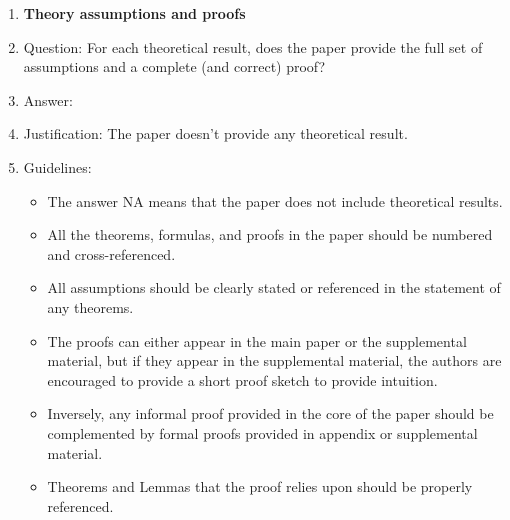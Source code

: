 \documentclass{article}
\begin{document}
\begin{enumerate}
\item {\bf Theory assumptions and proofs}
    \item[] Question: For each theoretical result, does the paper provide the full set of assumptions and a complete (and correct) proof?
    \item[] Answer: \answerNA{} %
    \item[] Justification: The paper doesn't provide any theoretical result.
    \item[] Guidelines:
    \begin{itemize}
        \item The answer NA means that the paper does not include theoretical results. 
        \item All the theorems, formulas, and proofs in the paper should be numbered and cross-referenced.
        \item All assumptions should be clearly stated or referenced in the statement of any theorems.
        \item The proofs can either appear in the main paper or the supplemental material, but if they appear in the supplemental material, the authors are encouraged to provide a short proof sketch to provide intuition. 
        \item Inversely, any informal proof provided in the core of the paper should be complemented by formal proofs provided in appendix or supplemental material.
        \item Theorems and Lemmas that the proof relies upon should be properly referenced. 
    \end{itemize}


\end{enumerate}
\end{document}
